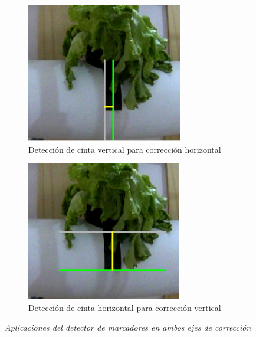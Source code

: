 \begin{figure}[H]
\centering
\begin{subfigure}[b]{0.48\textwidth}
    \centering
    \includegraphics[width=\textwidth]{imagenes/detector_marcadores_5_lineas_verticales.png}
    \caption{Detección de cinta vertical para corrección horizontal}
\end{subfigure}
\hfill
\begin{subfigure}[b]{0.48\textwidth}
    \centering
    \includegraphics[width=\textwidth]{imagenes/detector_marcadores_5_lineas_horizontales.png}
    \caption{Detección de cinta horizontal para corrección vertical}
\end{subfigure}
\caption{\textit{Aplicaciones del detector de marcadores en ambos ejes de corrección}}
\label{fig:aplicaciones_marcadores}
\end{figure}

